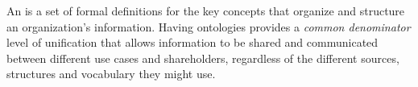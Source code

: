 %
%
An  is a set of formal definitions for the key concepts that organize and structure an
organization’s information.
Having ontologies provides a \textit{common denominator} level of unification that allows information to be shared and
communicated between different use cases and shareholders, regardless of the different sources,
structures and vocabulary they might use.

%
